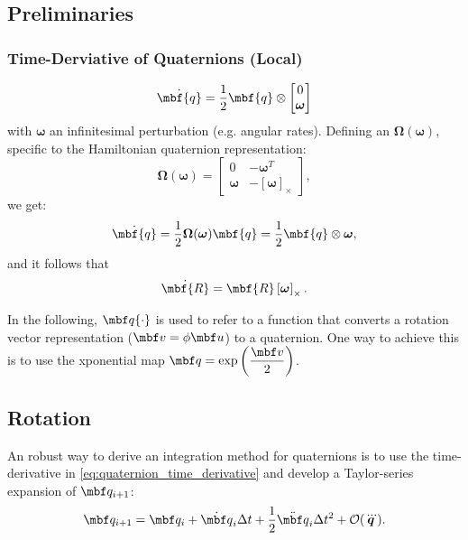 \documentclass[10pt,a4paper]{article}
\newcommand{\mbs}[1]{{\boldsymbol{#1}}}
\numberwithin{equation}{section}
\begin{document}
\subsection{Preliminaries}

\subsubsection{Time-Derviative of Quaternions (Local)}
\begin{equation}
\dot{\mbf{q}} = \dfrac{1}{2} \mbf{q} \otimes
\begin{bmatrix}
0 \\ \mbs{\omega}
\end{bmatrix}
\end{equation}
with $\mbs{\omega}$ an infinitesimal perturbation (e.g. angular rates). Defining an $\mbs \Omega(\mbs \omega)$, specific to the Hamiltonian quaternion representation:
\begin{equation}
\bm{\Omega}(\mbs{\omega}) = \begin{bmatrix}
0 & -\mbs{\omega}^T \\ \mbs{\omega} & -\left[ \mbs{\omega} \right]_{\times}
\end{bmatrix},
\end{equation}
we get:
\begin{equation}
\dot{\mbf{q}} = \dfrac{1}{2}\mbs{\Omega}(\mbs{\omega}){\mbf{q}}
= \dfrac{1}{2} \mbf{q} \otimes \mbs{\omega},
\label{eq:quaternion_time_derivative}
\end{equation}
and it follows that
\begin{equation}
\dot{\mbf{R}} = \mbf{R}\left[ \mbs{\omega} \right]_\times.
\end{equation}

In the following, $\mbf q \lbrace \cdot \rbrace$ is used to refer to a function that converts a rotation vector representation ($\mbf v = \phi \mbf u$) to a quaternion. One way to achieve this is to use the xponential map $\mbf q = \exp \left( \dfrac{\mbf v}{2} \right)$.


\subsection{Rotation}
An robust way to derive an integration method for quaternions is to use the time-derivative in \eqref{eq:quaternion_time_derivative} and develop a Taylor-series expansion of $\mbf q_{i+1}$:
\begin{equation}
\mbf q_{i+1} = \mbf q_i + \dot{\mbf q}_i \Delta t + \dfrac{1}{2} \ddot{\mbf q}_i \Delta t^2 + \mathcal{O}(\dddot{\mbs q}).
\label{eq:quaternion_taylor_series}
\end{equation}
\end{document}
